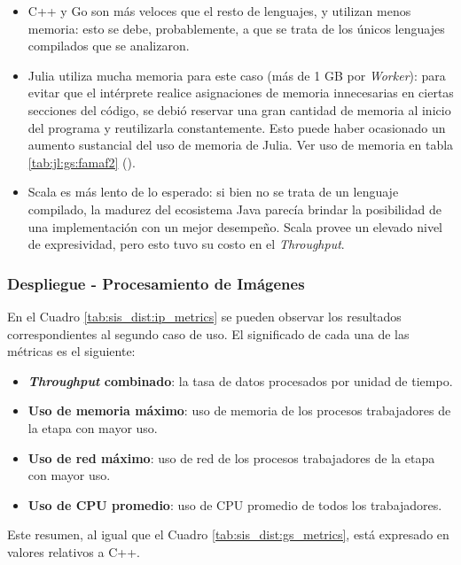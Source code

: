 \documentclass[11pt]{article}
\let\Oldsubsubsection\subsubsection
\renewcommand{\subsubsection}{\FloatBarrier\Oldsubsubsection}
\newcommand{\english}[1]{\textit{#1}}
\begin{document}
\begin{itemize}
    \item C++ y Go son más veloces que el resto de lenguajes, y utilizan menos memoria: esto se debe, probablemente, a que se trata de los únicos lenguajes compilados que se analizaron.
    \item Julia utiliza mucha memoria para este caso (más de 1 GB por \english{Worker}): para evitar que el intérprete realice asignaciones de memoria innecesarias en ciertas secciones del código, se debió reservar una gran cantidad de memoria al inicio del programa y reutilizarla constantemente. Esto puede haber ocasionado un aumento sustancial del uso de memoria de Julia. Ver uso de memoria en tabla \ref{tab:jl:gs:famaf2} ().
    \item Scala es más lento de lo esperado: si bien no se trata de un lenguaje compilado, la madurez del ecosistema Java parecía brindar la posibilidad de una implementación con un mejor desempeño. Scala provee un elevado nivel de expresividad, pero esto tuvo su costo en el \english{Throughput}.
\end{itemize}

\subsubsection{Despliegue - Procesamiento de Imágenes}

En el Cuadro \ref{tab:sis_dist:ip_metrics} se pueden observar los resultados correspondientes al segundo caso de uso. El significado de cada una de las métricas es el siguiente:

\begin{itemize}
    \item \textbf{\english{Throughput} combinado}: la tasa de datos procesados por unidad de tiempo.
    \item \textbf{Uso de memoria máximo}: uso de memoria de los procesos trabajadores de la etapa con mayor uso.
    \item \textbf{Uso de red máximo}: uso de red de los procesos trabajadores de la etapa con mayor uso.
    \item \textbf{Uso de CPU promedio}: uso de CPU promedio de todos los trabajadores.
\end{itemize}

Este resumen, al igual que el Cuadro \ref{tab:sis_dist:gs_metrics}, está expresado en valores relativos a C++.
\end{document}
